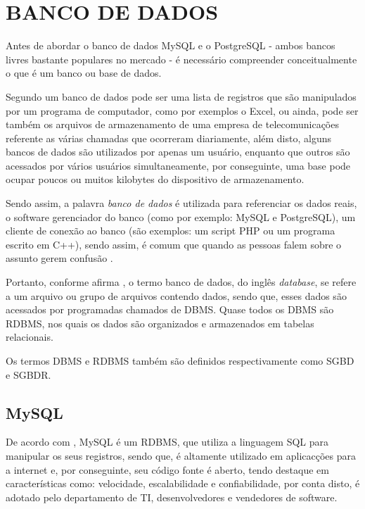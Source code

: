 \section{BANCO DE DADOS}

Antes de abordar o banco de dados \acs{MySQL} e o \acs{PostgreSQL} - ambos
bancos livres bastante populares no mercado - é necessário compreender
conceitualmente o que é um banco ou base de dados.
 
Segundo  um banco de dados pode ser uma
lista de registros que são manipulados por um programa de computador, como por
exemplos o \acs{Excel}, ou ainda, pode ser também os arquivos de armazenamento
de uma empresa de telecomunicações referente as várias chamadas que ocorreram
diariamente, além disto, alguns bancos de dados são utilizados por apenas um
usuário, enquanto que outros são acessados por vários usuários
simultaneamente, por conseguinte, uma base pode ocupar poucos ou muitos
kilobytes do dispositivo de armazenamento.

Sendo assim, a palavra \textit{banco de dados} é utilizada para referenciar os
dados reais, o software gerenciador do banco (como por exemplo: \acs{MySQL} e 
\acs{PostgreSQL}), um cliente de conexão ao banco (são exemplos: um script
\acs{PHP} ou um programa escrito em C++), sendo assim, é comum que quando as 
pessoas falem sobre o assunto gerem confusão \cite{theDefinitiveGuideToMySQL5}.

Portanto, conforme afirma , o termo banco de
dados, do inglês \textit{database}, se refere a um arquivo ou grupo de arquivos contendo dados, 
sendo que, esses dados são acessados por programadas chamados de \ac{DBMS}.
Quase todos os \acs{DBMS} são \ac{RDBMS}, nos quais
os dados são organizados e armazenados em tabelas relacionais.

Os termos \acs{DBMS} e \acs{RDBMS} também são definidos respectivamente como
\ac{SGBD} e \ac{SGBDR}.

\subsection{MySQL}

De acordo com , \acs{MySQL} é um
\acs{RDBMS},  que utiliza a linguagem \ac{SQL} para manipular os seus registros, 
sendo que, é altamente utilizado em aplicacções para a internet e, por
conseguinte,  seu código fonte é aberto, tendo destaque em características
como: velocidade, escalabilidade e confiabilidade, por conta disto, é adotado
pelo departamento de \ac{TI}, desenvolvedores e vendedores de software.

